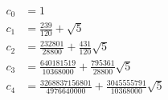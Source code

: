 \begin{align*}
c_{0} &= 1 \\
c_{1} &= \frac{239}{120} + \sqrt{5} \\
c_{2} &= \frac{232801}{28800} + \frac{431}{120}\sqrt{5} \\
c_{3} &= \frac{640181519}{10368000} + \frac{795361}{28800}\sqrt{5} \\
c_{4} &= \frac{3268837156801}{4976640000} + \frac{3045555791}{10368000}\sqrt{5}
\end{align*}
